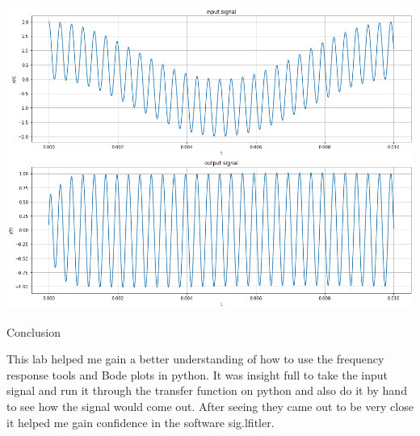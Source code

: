 \documentclass[nobib]{MSword}
\begin{document}
\includegraphics[scale = 0.45]
{txt/Lab10Fig4.png}

\begin{center}
    Conclusion
\end{center}
   This lab helped me gain a better understanding of how to use the frequency response tools and Bode plots in python. It was insight full to take the input signal and run it through the transfer function on python and also do it by hand to see how the signal would come out. After seeing they came out to be very close it helped me gain confidence in the software sig.lfitler.
\end{document}
